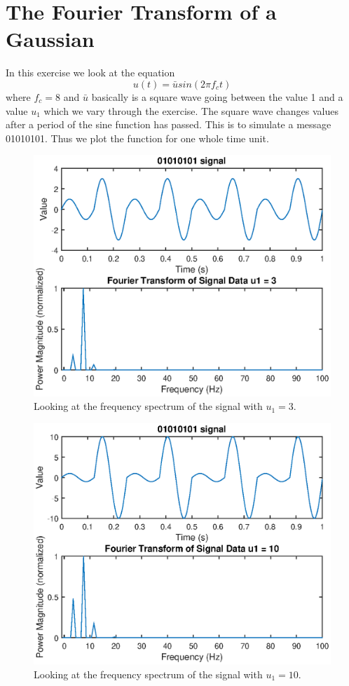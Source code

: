 \documentclass[11pt]{article}
\begin{document}
\section{The Fourier Transform of a Gaussian}
In this exercise we look at the equation 
\begin{equation}
	u(t) = \bar{u} sin(2 \pi f_c t )
\end{equation}
where $f_c = 8$ and $\bar{u}$ basically is a square wave going between the value 1 and a value $u_1$ which we vary through the exercise. The square wave changes values after a period of the sine function has passed. This is to simulate a message 01010101. Thus we plot the function for one whole time unit. 
\begin{figure}[H]
	\centering
	\includegraphics[width=1\textwidth]{../ex2/fftU1-3}
	\caption{Looking at the frequency spectrum of the signal with $u_1 = 3$.}
	\label{fig:fftU1-3}
\end{figure}
\begin{figure}[H]
	\centering
	\includegraphics[width=1\textwidth]{../ex2/fftU1-10}
	\caption{Looking at the frequency spectrum of the signal with $u_1 = 10$.}
	\label{fig:fftU1-10}
\end{figure}
\end{document}
